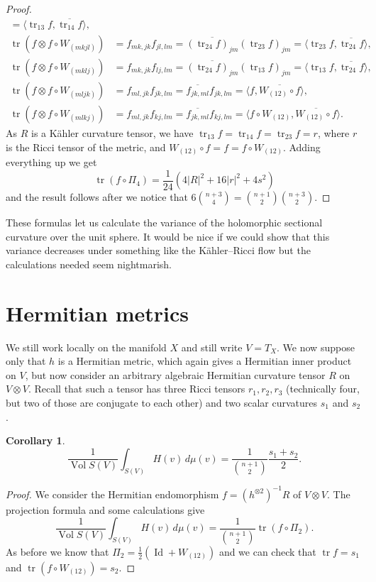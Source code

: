 \documentclass[10pt,a4paper]{amsart}
\newtheorem{coro}[theo]{Corollary}
\theoremstyle{definition}
\def\ov#1{\overline{#1}}
\def\d{\,d}
\DeclareMathOperator{\id}{Id}
\DeclareMathOperator{\tr}{tr}
\DeclareMathOperator{\Vol}{Vol}
\begin{document}
\begin{proof}
\begin{align*}
= \langle \tr_{13} f, \ov{\tr_{14} f} \rangle,
\\
\tr(f \otimes f \circ W_{(mkjl)})
&= f_{mk,jk} f_{jl,lm}
= \ov{(\tr_{24} f)_{jm}} (\tr_{23} f)_{jm}
= \langle \tr_{23} f, \ov{\tr_{24} f} \rangle,
\\
\tr(f \otimes f \circ W_{(mklj)})
&= f_{mk,jk} f_{lj,lm}
= \ov{(\tr_{24} f)_{jm}} (\tr_{13} f)_{jm}
= \langle \tr_{13} f, \ov{\tr_{24} f} \rangle,
\\
\tr(f \otimes f \circ W_{(mljk)})
&= f_{ml,jk} f_{jk,lm}
= \ov{f_{jk,ml}} f_{jk,lm}
= \langle f, \ov{W_{(12)} \circ f} \rangle,
\\
\tr(f \otimes f \circ W_{(mlkj)})
&= f_{ml,jk} f_{kj,lm}
= \ov{f_{jk,ml}} f_{kj,lm}
= \langle f \circ W_{(12)}, \ov{W_{(12)} \circ f} \rangle.
\end{align*}
As $R$ is a K\"ahler curvature tensor, we have $\tr_{13} f = \tr_{14} f =
\tr_{23} f = r$,
where $r$ is
the Ricci tensor of the metric, and $W_{(12)} \circ f = f = f \circ W_{(12)}$.
Adding everything up we get
$$
\tr(f \circ \Pi_4)
= \frac{1}{24} (4|R|^2 + 16 |r|^2 + 4 s^2)
$$
and the result follows after we notice that
\(
6 \binom{n+3}{4} = \binom{n+1}{2} \binom{n+3}{2}
\).
\end{proof}

These formulas let us calculate the variance of the holomorphic sectional
curvature over the unit sphere.
It would be nice if we could show that this variance decreases under something
like the K\"ahler--Ricci flow but the calculations needed seem nightmarish.


\section{Hermitian metrics}

We still work locally on the manifold $X$ and still write $V = T_X$.
We now suppose only that $h$ is a Hermitian metric, which again gives a
Hermitian inner product on $V$, but now consider an arbitrary algebraic
Hermitian curvature tensor $R$ on $V \otimes V$.
Recall that such a tensor has three Ricci tensors $r_1, r_2, r_3$ (technically
four, but two of those are conjugate to each other) and two
scalar curvatures $s_1$ and $s_2$.

\begin{coro}
$$
\frac{1}{\Vol S(V)} \int_{S(V)}
\!\!\!
H(v)  \d\mu(v)
= \frac{1}{\binom{n+1}{2}} \frac{s_1 + s_2}{2} .
$$
\end{coro}


\begin{proof}
We consider the Hermitian endomorphism $f = (h^{\otimes 2})^{-1} R$ of $V
\otimes V$.
The projection formula and some calculations give
$$
\frac{1}{\Vol S(V)} \int_{S(V)}
\!\!\!
H(v)  \d\mu(v)
= \frac{1}{\binom{n+1}{2}} \tr(f \circ \Pi_2).
$$
As before we know that $\Pi_2 = \frac12(\id + W_{(12)})$
and we can check that $\tr f = s_1$ and $\tr(f \circ W_{(12)}) = s_2$.
\end{proof}
\end{document}
